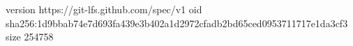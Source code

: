 version https://git-lfs.github.com/spec/v1
oid sha256:1d9bbab74e7d693fa439e3b402a1d2972cfadb2bd65ced0953711717e1da3cf3
size 254758

